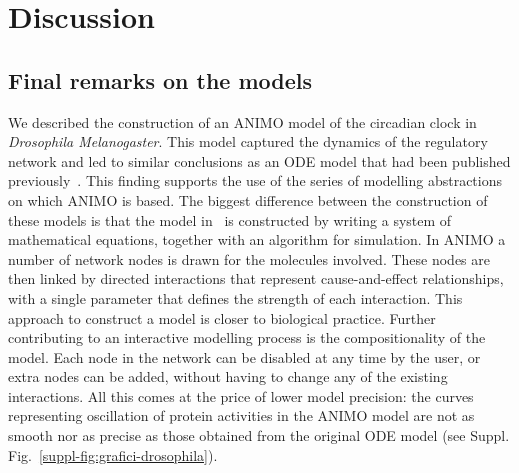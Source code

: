 \documentclass{bmcart}
\begin{document}
\section*{Discussion}
\subsection*{Final remarks on the models}
We described the construction of an ANIMO
model of the circadian clock in \emph{Drosophila Melanogaster}. This model
captured the dynamics of the regulatory network and led to similar
conclusions as an ODE model that had been
published previously~\cite{drosophila-ode-model}. This finding supports the use of
the series of modelling abstractions on which ANIMO is based. The biggest
difference between the construction of these models is that the model in~\cite{drosophila-ode-model}
is constructed by writing a system of mathematical equations, together
with an algorithm for simulation. In ANIMO a number of network
nodes is drawn for the molecules involved.
These nodes are then linked by directed
interactions that represent cause-and-effect relationships, with a single parameter
that defines the strength of each
interaction. This approach to construct a model is closer to biological practice.
Further contributing to an interactive modelling process
is the compositionality of the model. Each node in the network
can be disabled at any time by the user, or extra nodes can be added,
without having to change any of the existing interactions.
All this comes at the price of lower model precision: the curves representing
oscillation of protein activities in the ANIMO model are not as smooth
nor as precise as those obtained from the original ODE model (see Suppl. Fig.~\ref{suppl-fig:grafici-drosophila}).
\end{document}

